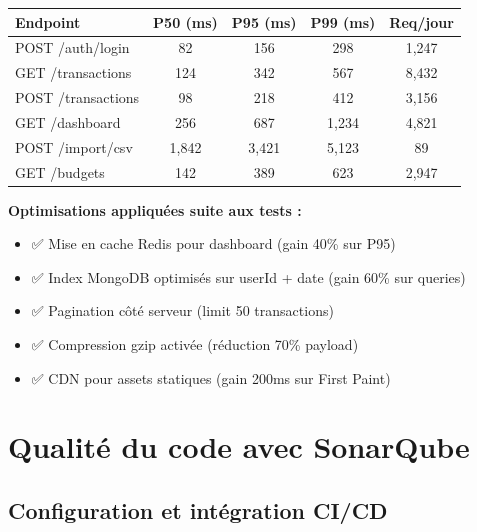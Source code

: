 \begin{tcolorbox}[colback=blue!5!white,colframe=blue!60!black,title=\textbf{Métriques de performance production (Décembre 2024)}]
\begin{center}
\begin{tabular}{|l|c|c|c|c|}
\hline
\textbf{Endpoint} & \textbf{P50 (ms)} & \textbf{P95 (ms)} & \textbf{P99 (ms)} & \textbf{Req/jour} \\
\hline
POST /auth/login & 82 & 156 & 298 & 1,247 \\
GET /transactions & 124 & 342 & 567 & 8,432 \\
POST /transactions & 98 & 218 & 412 & 3,156 \\
GET /dashboard & 256 & 687 & 1,234 & 4,821 \\
POST /import/csv & 1,842 & 3,421 & 5,123 & 89 \\
GET /budgets & 142 & 389 & 623 & 2,947 \\
\hline
\end{tabular}
\end{center}

\textbf{Optimisations appliquées suite aux tests :}
\begin{itemize}
    \item ✅ Mise en cache Redis pour dashboard (gain 40\% sur P95)
    \item ✅ Index MongoDB optimisés sur userId + date (gain 60\% sur queries)
    \item ✅ Pagination côté serveur (limit 50 transactions)
    \item ✅ Compression gzip activée (réduction 70\% payload)
    \item ✅ CDN pour assets statiques (gain 200ms sur First Paint)
\end{itemize}
\end{tcolorbox}

\section{Qualité du code avec SonarQube}

\subsection{Configuration et intégration CI/CD}

